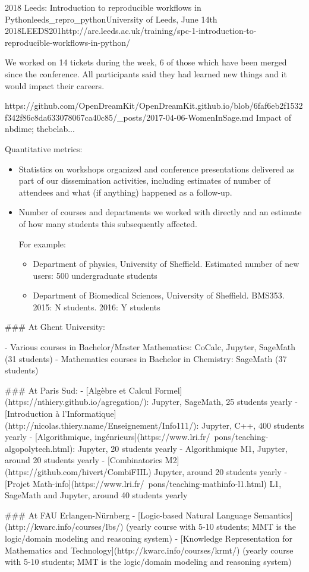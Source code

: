 \begin{Aim 1}
\begin{Aim 2}
\begin{event}{2018 Leeds: Introduction to reproducible workflows in Python}{leeds_repro_python}{University of Leeds, June 14th 
     2018}{LEEDS}{20}{1}{http://arc.leeds.ac.uk/training/spc-1-introduction-to-reproducible-workflows-in-python/}
\begin{itemize}
We worked on 14 tickets during the week, 6 of those which have been merged since the conference. All participants said they had learned new things and it would impact their careers.

https://github.com/OpenDreamKit/OpenDreamKit.github.io/blob/6faf6eb2f1532f342f86c8da633078067ca40c85/_posts/2017-04-06-WomenInSage.md
Impact of nbdime; thebelab...






Quantitative metrics:
\begin{itemize}
\item Statistics on workshops organized and conference presentations
  delivered as part of our dissemination activities, including
  estimates of number of attendees and what (if anything) happened as
  a follow-up.
\item Number of courses and departments we worked with directly and an
  estimate of how many students this subsequently affected.

  For example:
  \begin{itemize}
  \item Department of physics, University of Sheffield. Estimated
    number of new users: 500 undergraduate students
  \item Department of Biomedical Sciences, University of Sheffield.
    BMS353. 2015: N students. 2016: Y students
  \end{itemize}
\end{itemize}


### At Ghent University:

- Various courses in Bachelor/Master Mathematics: CoCalc, Jupyter, SageMath (31 students)
- Mathematics courses in Bachelor in Chemistry: SageMath (37 students)

### At Paris Sud:
- [Algèbre et Calcul Formel](https://nthiery.github.io/agregation/): Jupyter, SageMath, 25 students yearly
- [Introduction à l'Informatique](http://nicolas.thiery.name/Enseignement/Info111/): Jupyter, C++, 400 students yearly
- [Algorithmique, ingénrieurs](https://www.lri.fr/~pons/teaching-algopolytech.html): Jupyter, 20 students yearly
- Algorithmique M1, Jupyter, around 20 students yearly
- [Combinatorics M2](https://github.com/hivert/CombiFIIL) Jupyter, around 20 students yearly
- [Projet Math-info](https://www.lri.fr/~pons/teaching-mathinfo-l1.html) L1, SageMath and Jupyter, around 40 students yearly 

### At FAU Erlangen-Nürnberg
- [Logic-based Natural Language Semantics](http://kwarc.info/courses/lbs/) (yearly course with 5-10 students; MMT is the logic/domain modeling and reasoning system)
- [Knowledge Representation for Mathematics and Technology](http://kwarc.info/courses/krmt/) (yearly course with 5-10 students; MMT is the logic/domain modeling and reasoning system)


\end{itemize}
\end{event}
\end{Aim 2}
\end{Aim 1}
